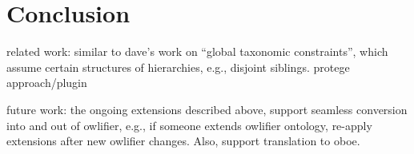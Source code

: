 \documentclass[preprint,number]{elsarticle}
\begin{document}
\section{Conclusion}
\label{sec:conclusion}


related work: similar to dave's work on ``global taxonomic
constraints'', which assume certain structures of hierarchies, e.g.,
disjoint siblings. protege approach/plugin

future work: the ongoing extensions described above, support seamless
conversion into and out of owlifier, e.g., if someone extends owlifier
ontology, re-apply extensions after new owlifier changes. Also,
support translation to oboe.



%


\end{document}
